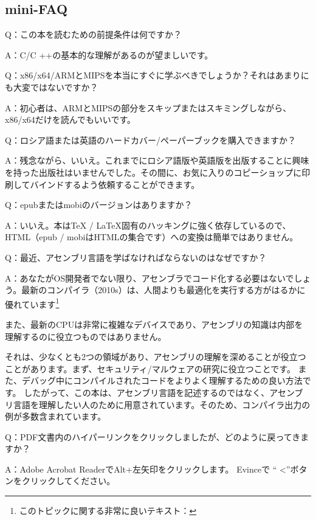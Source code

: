 \subsection*{mini-FAQ}

\par Q：この本を読むための前提条件は何ですか？
\par A：C/C ++の基本的な理解があるのが望ましいです。

\par Q：x86/x64/ARMとMIPSを本当にすぐに学ぶべきでしょうか？それはあまりにも大変ではないですか？
\par A：初心者は、ARMとMIPSの部分をスキップまたはスキミングしながら、x86/x64だけを読んでもいいです。

\par Q：ロシア語または英語のハードカバー/ペーパーブックを購入できますか？
\par A：残念ながら、いいえ。これまでにロシア語版や英語版を出版することに興味を持った出版社はいませんでした。その間に、お気に入りのコピーショップに印刷してバインドするよう依頼することができます。

\par Q：epubまたはmobiのバージョンはありますか？
\par A：いいえ。本はTeX / LaTeX固有のハッキングに強く依存しているので、HTML（epub / mobiはHTMLの集合です）への変換は簡単ではありません。

\par Q：最近、アセンブリ言語を学ばなければならないのはなぜですか？
\par A：あなたが\ac{OS}開発者でない限り、アセンブラでコード化する必要はないでしょう。最新のコンパイラ（2010s）は、人間よりも最適化を実行する方がはるかに優れています\footnote{このトピックに関する非常に良いテキスト：\InSqBrackets{\AgnerFog}}

また、最新のCPUは非常に複雑なデバイスであり、アセンブリの知識は内部を理解するのに役立つものではありません。

それは、少なくとも2つの領域があり、アセンブリの理解を深めることが役立つことがあります。まず、セキュリティ/マルウェアの研究に役立つことです。 また、デバッグ中にコンパイルされたコードをよりよく理解するための良い方法です。 したがって、この本は、アセンブリ言語を記述するのではなく、アセンブリ言語を理解したい人のために用意されています。そのため、コンパイラ出力の例が多数含まれています。

\par Q：PDF文書内のハイパーリンクをクリックしましたが、どのように戻ってきますか？
\par A：Adobe Acrobat ReaderでAlt+左矢印をクリックします。 Evinceで `` <''ボタンをクリックしてください。

